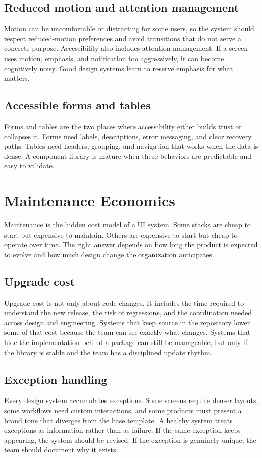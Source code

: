 \documentclass[11pt,twoside,a4paper]{article}
\begin{document}
\subsection{Reduced motion and attention management}
Motion can be uncomfortable or distracting for some users, so the system should respect reduced-motion preferences and avoid transitions that do not serve a concrete purpose. Accessibility also includes attention management. If a screen uses motion, emphasis, and notification too aggressively, it can become cognitively noisy. Good design systems learn to reserve emphasis for what matters.

\subsection{Accessible forms and tables}
Forms and tables are the two places where accessibility either builds trust or collapses it. Forms need labels, descriptions, error messaging, and clear recovery paths. Tables need headers, grouping, and navigation that works when the data is dense. A component library is mature when these behaviors are predictable and easy to validate.

\section{Maintenance Economics}
Maintenance is the hidden cost model of a UI system. Some stacks are cheap to start but expensive to maintain. Others are expensive to start but cheap to operate over time. The right answer depends on how long the product is expected to evolve and how much design change the organization anticipates.

\subsection{Upgrade cost}
Upgrade cost is not only about code changes. It includes the time required to understand the new release, the risk of regressions, and the coordination needed across design and engineering. Systems that keep source in the repository lower some of that cost because the team can see exactly what changes. Systems that hide the implementation behind a package can still be manageable, but only if the library is stable and the team has a disciplined update rhythm.

\subsection{Exception handling}
Every design system accumulates exceptions. Some screens require denser layouts, some workflows need custom interactions, and some products must present a brand tone that diverges from the base template. A healthy system treats exceptions as information rather than as failure. If the same exception keeps appearing, the system should be revised. If the exception is genuinely unique, the team should document why it exists.
\end{document}
